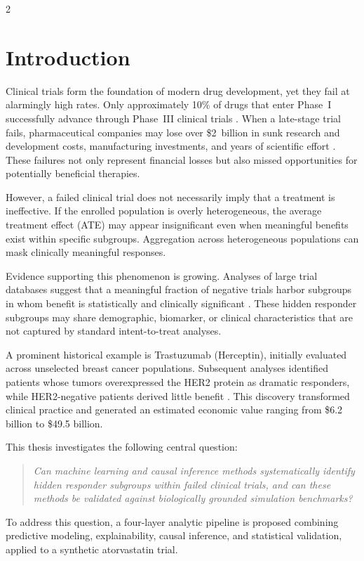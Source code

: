 \documentclass[12pt]{article}
\begin{document}
\begin{multicols}{2}

\section{Introduction}

Clinical trials form the foundation of modern drug development, yet they
fail at alarmingly high rates.  Only approximately 10\% of drugs that enter
Phase~I successfully advance through Phase~III clinical trials
\citep{wong2019estimation}.  When a late-stage trial fails, pharmaceutical
companies may lose over \$2~billion in sunk research and development costs,
manufacturing investments, and years of scientific effort
\citep{dimasi2016innovation}.  These failures not only represent financial
losses but also missed opportunities for potentially beneficial therapies.

However, a failed clinical trial does not necessarily imply that a treatment
is ineffective.  If the enrolled population is overly heterogeneous, the
average treatment effect (ATE) may appear insignificant even when meaningful
benefits exist within specific subgroups.  Aggregation across heterogeneous
populations can mask clinically meaningful responses.

Evidence supporting this phenomenon is growing.  Analyses of large trial
databases suggest that a meaningful fraction of negative trials harbor
subgroups in whom benefit is statistically and clinically significant
\citep{kent2020predictive}.  These hidden responder subgroups may share
demographic, biomarker, or clinical characteristics that are not captured by
standard intent-to-treat analyses.

A prominent historical example is Trastuzumab (Herceptin), initially
evaluated across unselected breast cancer populations.  Subsequent analyses
identified patients whose tumors overexpressed the HER2 protein as dramatic
responders, while HER2-negative patients derived little benefit
\citep{slamon1987human}.  This discovery transformed clinical practice and
generated an estimated economic value ranging from \$6.2 billion to
\$49.5 billion.

This thesis investigates the following central question:
\begin{quote}
\textit{Can machine learning and causal inference methods systematically
identify hidden responder subgroups within failed clinical trials, and can
these methods be validated against biologically grounded simulation
benchmarks?}
\end{quote}
To address this question, a four-layer analytic pipeline is proposed
combining predictive modeling, explainability, causal inference, and
statistical validation, applied to a synthetic atorvastatin trial.


\end{multicols}
\end{document}
